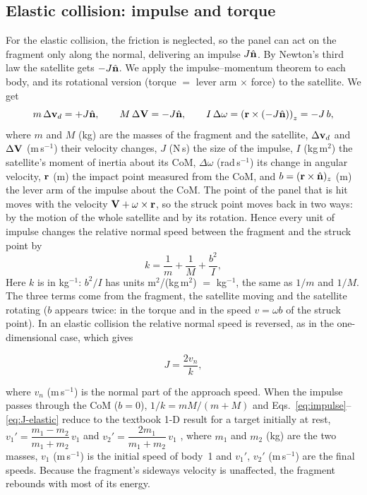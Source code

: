 \subsection{Elastic collision: impulse and torque}

For the elastic collision, the friction is neglected, so the panel can act on the fragment only along the normal, 
delivering an impulse $J\hat{\mathbf{n}}$. By Newton's
third law the satellite gets $-J\hat{\mathbf{n}}$. We apply the impulse--momentum theorem to each body, and its rotational version
(torque $=$ lever arm $\times$ force) to the satellite. We get
\begin{equation}
  m\,\Delta\mathbf{v}_d = +J\hat{\mathbf{n}},\qquad
  M\,\Delta\mathbf{V} = -J\hat{\mathbf{n}},\qquad
  I\,\Delta\omega = \left(\mathbf{r}\times(-J\hat{\mathbf{n}})\right)_z = -J\,b,
  \label{eq:impulse}
\end{equation}
where $m$ and $M$ (kg) are the masses of the fragment and the satellite,
$\Delta\mathbf{v}_d$ and $\Delta\mathbf{V}$ (m\,s$^{-1}$) their velocity changes,
$J$ (N\,s) the size of the impulse, $I$ (kg\,m$^2$) the satellite's moment
of inertia about its CoM, $\Delta\omega$ (rad\,s$^{-1}$) its change in
angular velocity, $\mathbf{r}$ (m) the impact point measured from the CoM, and
$b=(\mathbf{r}\times\hat{\mathbf{n}})_z$ (m) the lever arm of the impulse about
the CoM.
The point of the panel that is hit moves with
the velocity $\mathbf{V}+\mathbf{\omega}\times\mathbf{r}$, so the struck point moves back
in two ways: by the motion of the whole satellite and by its rotation. Hence every unit of
impulse changes the relative normal speed between the fragment and the struck
point by
\begin{equation}
  k = \frac{1}{m}+\frac{1}{M}+\frac{b^{2}}{I},
  \label{eq:k}
\end{equation}
Here $k$ is in kg$^{-1}$: $b^2/I$ has units m$^2$/(kg\,m$^2$) $=$ kg$^{-1}$,
the same as $1/m$ and $1/M$.
 The three terms come from the
fragment, the satellite moving and the satellite rotating ($b$ appears twice: in the torque and in the speed $v=\omega b$ of the struck point). In an elastic collision the
relative normal speed is reversed, as in the one-dimensional case,
which gives

\begin{equation}
  J=\frac{2v_n}{k},
  \label{eq:J-elastic}
\end{equation}

where $v_n$ (m\,s$^{-1}$) is the normal part of the approach speed.
When the impulse passes through the CoM
($b=0$), $1/k=mM/(m+M)$ and
Eqs.~\eqref{eq:impulse}--\eqref{eq:J-elastic} reduce to the textbook 1-D result
for a target initially at rest,
$v_1'=\dfrac{m_1-m_2}{m_1+m_2}\,v_1$ and
$v_2'=\dfrac{2m_1}{m_1+m_2}\,v_1$ \citep{ling2016},
where $m_1$ and $m_2$ (kg) are the two masses, $v_1$ (m\,s$^{-1}$) is the
initial speed of body~1 and $v_1'$, $v_2'$ (m\,s$^{-1}$) are the final
speeds.
Because the fragment's sideways velocity is unaffected, the
fragment rebounds with most of its energy.

